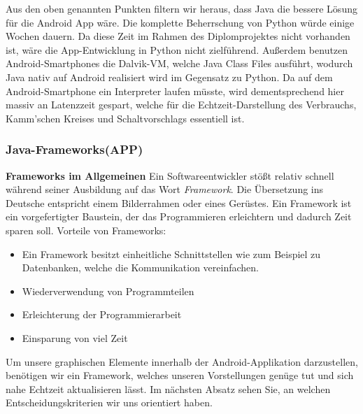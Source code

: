 Aus den oben genannten Punkten filtern wir heraus, dass Java die bessere Lösung für die Android App wäre. 
Die komplette Beherrschung von Python würde einige Wochen dauern. 
Da diese Zeit im Rahmen des Diplomprojektes nicht vorhanden ist, wäre die App-Entwicklung in Python nicht zielführend. 
Außerdem benutzen Android-Smartphones die Dalvik-VM, welche Java Class Files ausführt, wodurch Java nativ auf Android realisiert wird im Gegensatz zu Python. 
Da auf dem Android-Smartphone ein Interpreter laufen müsste, wird dementsprechend hier massiv an Latenzzeit gespart, welche für die Echtzeit-Darstellung des Verbrauchs, Kamm'schen Kreises und Schaltvorschlags essentiell ist.

\clearpage
\subsubsection{Java-Frameworks(APP)}
\textbf{Frameworks im Allgemeinen\newline}
Ein Softwareentwickler stößt relativ schnell während seiner Ausbildung
auf das Wort \textit{Framework}. Die Übersetzung ins Deutsche entspricht einem Bilderrahmen oder eines Gerüstes.
Ein Framework ist ein vorgefertigter Baustein, der das Programmieren erleichtern und dadurch Zeit sparen soll.
Vorteile von Frameworks:
\begin{itemize}
	\item Ein Framework besitzt einheitliche Schnittstellen wie zum Beispiel zu Datenbanken, welche die Kommunikation vereinfachen. 
	\item Wiederverwendung von Programmteilen
	\item Erleichterung der Programmierarbeit
	\item Einsparung von viel Zeit
\end{itemize}
Um unsere graphischen Elemente innerhalb der Android-Applikation darzustellen, benötigen wir ein Framework, welches unseren Vorstellungen genüge tut und
sich nahe Echtzeit aktualisieren lässt. Im nächsten Absatz sehen Sie, an welchen Entscheidungskriterien wir uns orientiert haben. 
